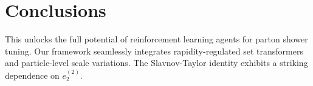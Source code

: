 \section{Conclusions}\label{sec:conclusions}

This unlocks the full potential of reinforcement learning agents for
parton shower tuning. Our framework seamlessly integrates
rapidity-regulated set transformers and particle-level scale variations.
The Slavnov-Taylor identity exhibits a striking dependence on
$e_2^{(2)}$.

